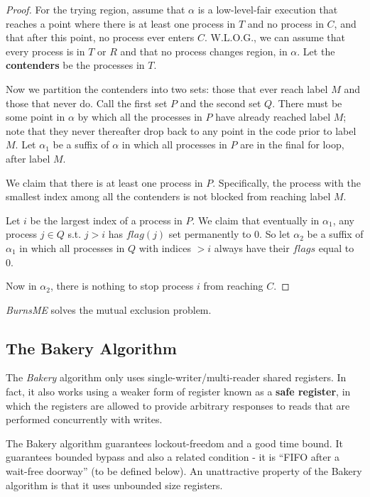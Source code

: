\documentclass[11pt]{article}
\begin{document}
\begin{proof}
For the trying region, assume that \(\alpha\) is a low-level-fair execution that reaches a point where
there is at least one process in \(T\) and no process in \(C\), and that after this point, no process
ever enters \(C\). W.L.O.G., we can assume that every process is in \(T\) or \(R\) and that no process
changes region, in \(\alpha\). Let the \textbf{contenders} be the processes in \(T\).

Now we partition the contenders into two sets: those that ever reach label \(M\) and those that never
do. Call the first set \(P\) and the second set \(Q\). There must be some point in \(\alpha\) by which
all the processes in \(P\) have already reached label \(M\); note that they never thereafter drop
back to any point in the code prior to label \(M\). Let \(\alpha_1\) be a suffix of \(\alpha\) in
which all processes in \(P\) are in the final for loop, after label \(M\).

We claim that there is at least one process in \(P\). Specifically, the process with the smallest
index among all the contenders is not blocked from reaching label \(M\).

Let \(i\) be the largest index of a process in \(P\). We claim that eventually in \(\alpha_1\), any
process \(j\in Q\) s.t. \(j>i\) has \(flag(j)\) set permanently to 0. So let \(\alpha_2\) be a suffix
of \(\alpha_1\) in which all processes in \(Q\) with indices \(>i\) always have their \(flags\) equal
to 0.

Now in \(\alpha_2\), there is nothing to stop process \(i\) from reaching \(C\).
\end{proof}

\begin{theorem}[]
\emph{BurnsME} solves the mutual exclusion problem.
\end{theorem}
\subsection{The Bakery Algorithm}
\label{sec:org689e109}
The \emph{Bakery} algorithm only uses single-writer/multi-reader shared registers. In fact, it also works
using a weaker form of register known as a \textbf{safe register}, in which the registers are allowed to
provide arbitrary responses to reads that are performed concurrently with writes.

The Bakery algorithm guarantees lockout-freedom and a good time bound. It guarantees bounded bypass
and also a related condition - it is ``FIFO after a wait-free doorway'' (to be defined below). An
unattractive property of the Bakery algorithm is that it uses unbounded size registers.
\end{document}
